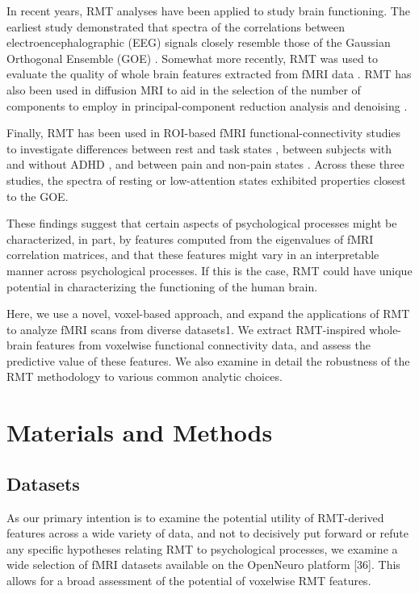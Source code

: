 \documentclass[NETN,manuscript]{stjour-new}
\begin{document}
In recent years, RMT analyses have been applied to study brain functioning.  The earliest  study
demonstrated that spectra of the correlations between electroencephalographic (EEG) signals closely
resemble those of the Gaussian Orthogonal Ensemble (GOE) \citep{sebaRandomMatrixAnalysis2003}.
Somewhat more recently, RMT was used to evaluate the quality of whole brain features extracted from
fMRI data \citep{voultsidouFeatureEvaluationFMRI2007,verganiRestingStateFMRI2019}. RMT has also
been used in diffusion MRI to aid in the selection of the number of components to employ in
principal-component reduction analysis and denoising
\citep{veraartDenoisingDiffusionMRI2016,verganiRestingStateFMRI2019,ulfarssonDimensionEstimationNoisy2008}.

Finally, RMT has been used in ROI-based fMRI functional-connectivity studies to investigate
differences between rest and task states \citep{wangSpectralPropertiesTemporal2015}, between
subjects with and without ADHD \citep{wangRandomMatrixTheory2016}, and between pain and non-pain
states \citep{matharooSpontaneousBackpainAlters2020}. Across these three studies, the spectra of
resting or low-attention states exhibited properties closest to the GOE.

These findings suggest that certain aspects of psychological processes might be characterized, in
part, by features computed from the eigenvalues of fMRI correlation matrices, and that these
features might vary in an interpretable manner across psychological processes. If this is the case,
RMT could have unique potential in characterizing the functioning of the human brain.

Here, we use a novel, voxel-based approach, and expand the applications of RMT to analyze fMRI scans
from  diverse datasets1. We extract RMT-inspired whole-brain features from voxelwise functional
connectivity data, and assess the predictive value of these features. We also examine in detail the
robustness of the RMT methodology to various common analytic choices.

\section{Materials and Methods}

\subsection{Datasets}

As our primary intention is to examine the potential utility of RMT-derived features across a wide
variety of data, and not to decisively put forward or refute any specific hypotheses relating RMT to
psychological processes, we examine a wide selection of fMRI datasets available on the OpenNeuro
platform [36].  This allows for a broad assessment of the potential of voxelwise RMT features.
\end{document}
